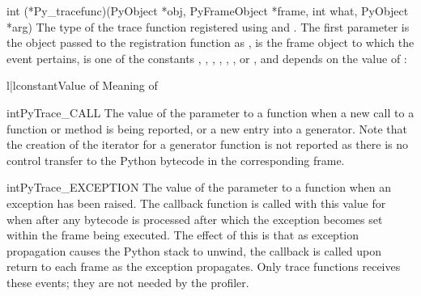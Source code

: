 \begin{ctypedesc}[Py_tracefunc]{int (*Py_tracefunc)(PyObject *obj,
                                PyFrameObject *frame, int what,
                                PyObject *arg)}
  The type of the trace function registered using
   and .
  The first parameter is the object passed to the registration
  function as ,  is the frame object to which the
  event pertains,  is one of the constants
  , ,
  , ,
  , ,
  or , and 
  depends on the value of :

  \begin{tableii}{l|l}{constant}{Value of }{Meaning of }
  \end{tableii}
\end{ctypedesc}

\begin{cvardesc}{int}{PyTrace_CALL}
  The value of the  parameter to a 
  function when a new call to a function or method is being reported,
  or a new entry into a generator.  Note that the creation of the
  iterator for a generator function is not reported as there is no
  control transfer to the Python bytecode in the corresponding frame.
\end{cvardesc}

\begin{cvardesc}{int}{PyTrace_EXCEPTION}
  The value of the  parameter to a 
  function when an exception has been raised.  The callback function
  is called with this value for  when after any bytecode is
  processed after which the exception becomes set within the frame
  being executed.  The effect of this is that as exception propagation
  causes the Python stack to unwind, the callback is called upon
  return to each frame as the exception propagates.  Only trace
  functions receives these events; they are not needed by the
  profiler.
\end{cvardesc}

